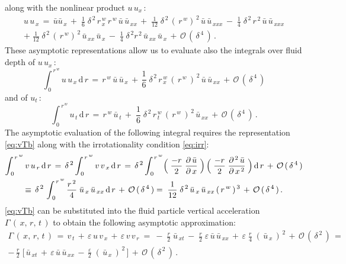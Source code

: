 \documentclass[alpha-refs, 12pt]{wiley-article}
\renewcommand{\O}{\mathcal{O}}
\newcommand{\eps}{\varepsilon}
\begin{document}
along with the nonlinear product $u\,u_x\,$:
\begin{multline*}
  u\,u_{\,x}\,=\,\bar{u}\bar{u}_{\,x}\,+\;\frac{1}{6}\;\delta^{\,2}\,r^{\,w}_{\,x}\,r^{\,w}\,\bar{u}\,\bar{u}_{\,xx}\,+\;\frac{1}{12}\;\delta^{\,2}\,(\,r^{\,w})^{\,2}\,\bar{u}\,\bar{u}_{\,xxx}\,-\;\frac{1}{4}\;\delta^{\,2}\,r^{\,2}\,\bar{u}\,\bar{u}_{\,xxx} \\
  +\;\frac{1}{12}\;\delta^{\,2}\,(\,r^{\,w})^{\,2}\,\bar{u}_{\,xx}\,\bar{u}_{\,x}\,
  -\;\frac{1}{4}\;\delta^{\,2}r^{\,2}\,\bar{u}_{\,xx}\,\bar{u}_{\,x}\,+\,\O\,(\,\delta^{\,4}\,)\,.
\end{multline*}
These asymptotic representations allow us to evaluate also the integrals over fluid depth of $u\,u_x\,$:
\begin{equation*}
  \int_{\,0}^{\,r^{\,w}}u\,u_{\,x}\,\mathrm{d}\,r\, = \,r^{\,w}\,\bar{u}\,\bar{u}_{\,x}\, +\,\frac{1}{6}\;\delta^{\,2}\,r^{\,w}_{\,x}\,(\,r^{\,w}\,)^{\,2}\,\bar{u}\,\bar{u}_{\,xx}\,+\,\O\,(\,\delta^{\,4}\,)
\end{equation*}
and of $u_t\,$:
\begin{equation*}
  \int_{\,0}^{\,r^{\,w}}u_{\,t}\,\mathrm{d}\,r\,=\,r^{\,w}\,\bar{u}_{\,t}\,+\;\frac{1}{6}\;\delta^{\,2}\,r^{\,w}_{\,t}\,(\,r^{\,w}\,)^{\,2}\,\bar{u}_{\,xx}\,+\,\O\,(\,\delta^{\,4}\,)\,.
\end{equation*}
The asymptotic evaluation of the following integral requires the representation \eqref{eq:vTb} along with the irrotationality condition \eqref{eq:irr}:
\begin{multline*}
  \int_{\,0}^{\,r^{\,w}}v\,u_{\,r}\,\mathrm{d}\,r\, = \,\delta^{\,2}\int_{\,0}^{\,r^{\,w}}v\,v_{\,x}\,\mathrm{d}\,r\, = \, \delta^{\,2} \int_{\,0}^{\,r^{\,w}}\Bigl(\;\frac{-r}{2}\;\frac{\partial \,\bar{u}}{\partial\, x}\;\Bigr)\,\Bigl(\;\frac{-r}{2}\;\frac{\partial^{\,2}\,\bar{u}}{\partial\, x^{\,2}}\; \Bigr)\, \mathrm{d}\,r\, + \,\O\,(\,\delta^{\,4}\,) \\
  \equiv \,\delta^{\,2}\, \int_{\,0}^{\,r^{\,w}}\frac{r^{\,2}}{4}\; \bar{u}_{\,x}\, \bar{u}_{\,xx}\, \mathrm{d}\,r\, + \,\O\,(\,\delta^{\,4}\,) = \;\frac{1}{12}\;\delta^{\,2}\, \bar{u}_{\,x}\, \bar{u}_{\,xx}\,(\,r^{\,w}\,)^{\,3}\, + \,\O\,(\,\delta^{\,4}\,)\,.
\end{multline*}
\cref{eq:vTb} can be substituted into the fluid particle vertical acceleration $\Gamma\,(\,x,\,r,\,t\,)$ to obtain the following asymptotic approximation:
\begin{multline*}
  \Gamma\,(\,x,\,r,\,t\,)\,=\,v_{\,t}\,+\,\eps\,u\,v_{\,x}\,+\,\eps\,v\,v_{\,r}\ =\ -\;\frac{r}{2}\;\bar{u}_{\,xt}\,-\;\frac{r}{2}\;\eps\,\bar{u}\,\bar{u}_{\,xx}\,+\,\eps\; \frac{r}{4}\;(\,\bar{u}_{\,x}\,)^{\,2}\, +\, \O\,(\,\delta^{\,2}\,)\, =\\
  -\,\frac{r}{2}\;\bigl[\,\bar{u}_{\,xt}\,+\,\eps\,\bar{u}\,\bar{u}_{\,xx}\,-\,\frac{\eps}{2}\;(\,\bar{u}_{\,x}\,)^{\,2}\,\bigr]\, + \,\O\,(\,\delta^{\,2}\,)\,.
\end{multline*}
\end{document}
